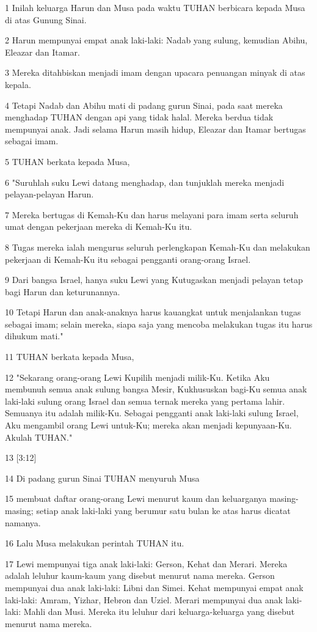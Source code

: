 \par 1 Inilah keluarga Harun dan Musa pada waktu TUHAN berbicara kepada Musa di atas Gunung Sinai.
\par 2 Harun mempunyai empat anak laki-laki: Nadab yang sulung, kemudian Abihu, Eleazar dan Itamar.
\par 3 Mereka ditahbiskan menjadi imam dengan upacara penuangan minyak di atas kepala.
\par 4 Tetapi Nadab dan Abihu mati di padang gurun Sinai, pada saat mereka menghadap TUHAN dengan api yang tidak halal. Mereka berdua tidak mempunyai anak. Jadi selama Harun masih hidup, Eleazar dan Itamar bertugas sebagai imam.
\par 5 TUHAN berkata kepada Musa,
\par 6 "Suruhlah suku Lewi datang menghadap, dan tunjuklah mereka menjadi pelayan-pelayan Harun.
\par 7 Mereka bertugas di Kemah-Ku dan harus melayani para imam serta seluruh umat dengan pekerjaan mereka di Kemah-Ku itu.
\par 8 Tugas mereka ialah mengurus seluruh perlengkapan Kemah-Ku dan melakukan pekerjaan di Kemah-Ku itu sebagai pengganti orang-orang Israel.
\par 9 Dari bangsa Israel, hanya suku Lewi yang Kutugaskan menjadi pelayan tetap bagi Harun dan keturunannya.
\par 10 Tetapi Harun dan anak-anaknya harus kauangkat untuk menjalankan tugas sebagai imam; selain mereka, siapa saja yang mencoba melakukan tugas itu harus dihukum mati."
\par 11 TUHAN berkata kepada Musa,
\par 12 "Sekarang orang-orang Lewi Kupilih menjadi milik-Ku. Ketika Aku membunuh semua anak sulung bangsa Mesir, Kukhususkan bagi-Ku semua anak laki-laki sulung orang Israel dan semua ternak mereka yang pertama lahir. Semuanya itu adalah milik-Ku. Sebagai pengganti anak laki-laki sulung Israel, Aku mengambil orang Lewi untuk-Ku; mereka akan menjadi kepunyaan-Ku. Akulah TUHAN."
\par 13 [3:12]
\par 14 Di padang gurun Sinai TUHAN menyuruh Musa
\par 15 membuat daftar orang-orang Lewi menurut kaum dan keluarganya masing-masing; setiap anak laki-laki yang berumur satu bulan ke atas harus dicatat namanya.
\par 16 Lalu Musa melakukan perintah TUHAN itu.
\par 17 Lewi mempunyai tiga anak laki-laki: Gerson, Kehat dan Merari. Mereka adalah leluhur kaum-kaum yang disebut menurut nama mereka. Gerson mempunyai dua anak laki-laki: Libni dan Simei. Kehat mempunyai empat anak laki-laki: Amram, Yizhar, Hebron dan Uziel. Merari mempunyai dua anak laki-laki: Mahli dan Musi. Mereka itu leluhur dari keluarga-keluarga yang disebut menurut nama mereka.
